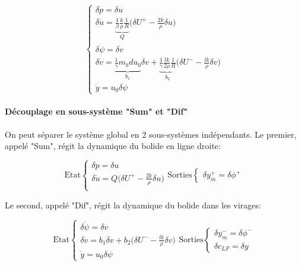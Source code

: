 \documentclass{report}
\begin{document}
\begin{equation*}
    \begin{cases}
        \delta{\dot p} = \delta u \\
        \delta{\dot u} = \underbrace{\frac{1}{\beta}\frac{k}{\rho}\frac{1}{R}}_{Q} \big( \delta U^+ - \frac{2k}{\rho}\delta u \big)\\
        \delta{\dot \psi} = \delta v \\
        \delta{\dot v} = \underbrace{\frac{1}{\gamma} m_bd u_0}_{b_1} \delta v + 
        \underbrace{\frac{1}{\gamma}\frac{lk}{2\rho}\frac{1}{R}}_{b_2}\big( \delta U^- - \frac{lk}{\rho}\delta v \big) \\
        \dot{y} = u_0\delta \psi        
    \end{cases}
\end{equation*}


\paragraph{Découplage en sous-système "Sum" et "Dif"}

On peut séparer le système global en 2 sous-systèmes indépendants.
Le premier, appelé "Sum", régit la dynamique du bolide
en ligne droite:

\begin{equation*}
    \text{Etat}
    \begin{cases}
        \delta{\dot p} = \delta u \\
        \delta{\dot u} = Q\big( \delta U^+ - \frac{2k}{\rho}\delta u \big)\\
    \end{cases}
    \text{Sorties}
    \begin{cases}
        \delta y_m^+ = \delta \phi^+        
    \end{cases}
\end{equation*}

Le second, appelé "Dif", régit la dynamique du bolide dans les virages:

\begin{equation*}
    \text{Etat}
    \begin{cases}
        \delta{\dot \psi} = \delta v \\
        \delta{\dot v} = b_1\delta v + b_2\big( \delta U^- - \frac{lk}{\rho}\delta v \big) \\
        \dot{y} = u_0\delta \psi        
    \end{cases}
    \text{Sorties}
    \begin{cases}
        \delta y_m^- = \delta \phi^- \\ 
        \delta c_{LF} = \delta y  
    \end{cases}
\end{equation*}
\end{document}
